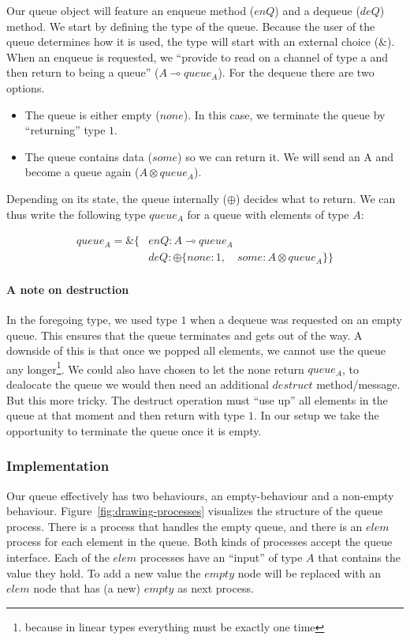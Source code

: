 \documentclass{article}
\begin{document}
	Our queue object will feature an enqueue method (\(enQ\)) and a dequeue (\(deQ\)) method. We start by defining the type of the queue. Because the user of the queue determines how it is used, the type will start with an external choice (\(\&\)). When an enqueue is requested, we ``provide to read on a channel of type a and then return to being a queue'' (\(A \multimap queue_A\)). For the dequeue there are two options. 
	\begin{itemize}
		\item The queue is either empty (\(none\)). In this case, we terminate the queue by ``returning'' type $1$.
		\item The queue contains data (\(some\)) so we can return it. We will send an A and become a queue again (\(A \otimes queue_A\)).
	\end{itemize}
	Depending on its state, the queue internally (\(\oplus\)) decides what to return. We can thus write the following type \(queue_A\) for a queue with elements of type \(A\):
	
	\begin{align*}
		queue_A = \&\lbrace &enQ : A \multimap queue_A \\
		              &deQ : \oplus \lbrace  none:1 , \quad some: A \otimes queue_A \rbrace
		\rbrace
	\end{align*}
	
	\paragraph{A note on destruction} In the foregoing type, we used type \(1\) when a dequeue was requested on an empty queue. This ensures that the queue terminates and gets out of the way. A downside of this is that once we popped all elements, we cannot use the queue any longer\footnote{because in linear types everything must be exactly one time}. We could also have chosen to let the none return \(queue_A\), to dealocate the queue we would then need an additional \(destruct\) method/message. But this more tricky. The destruct operation must ``use up'' all elements in the queue at that moment and then return with type \(1\). In our setup we take the opportunity to terminate the queue once it is empty. 
	
	
	\subsubsection{Implementation}
	
	Our queue effectively has two behaviours, an empty-behaviour and a non-empty behaviour.
	Figure~\ref{fig:drawing-processes} visualizes the structure of the queue process. There is a process that handles the empty queue, 
	and there is an \(elem\) process for each element in the queue. Both kinds of processes accept the queue interface.
	Each of the \(elem\) processes have an ``input'' of type \(A\) that contains the value they hold. To add a new value the \(empty\) node will be replaced with an \(elem\) node that has (a new) \(empty\) as next process.
	
\end{document}
